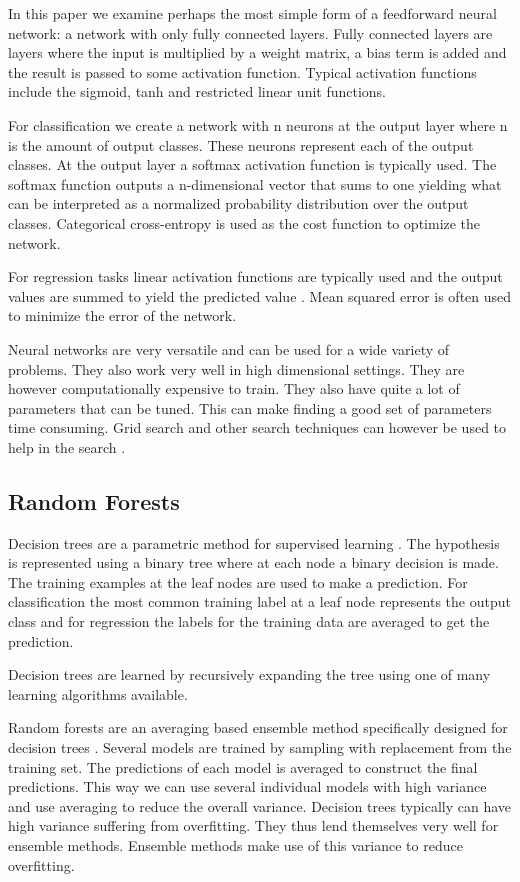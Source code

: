 In this paper we examine perhaps the most simple form of a feedforward neural network: a network with only fully connected layers. Fully connected layers are layers where the input is multiplied by a weight matrix, a bias term is added and the result is passed to some activation function. Typical activation functions include the sigmoid, tanh and restricted linear unit functions.

For classification we create a network with n neurons at the output layer where n is the amount of output classes. These neurons represent each of the output classes. At the output layer a softmax activation function is typically used. The softmax function outputs a n-dimensional vector that sums to one yielding what can be interpreted as a normalized probability distribution over the output classes. Categorical cross-entropy is used as the cost function to optimize the network.

For regression tasks linear activation functions are typically used and the output values are summed to yield the predicted value \cite{deeplearning4j-docs}. Mean squared error is often used to minimize the error of the network.

Neural networks are very versatile and can be used for a wide variety of problems. They also work very well in high dimensional settings. They are however computationally expensive to train. They also have quite a lot of parameters that can be tuned. This can make finding a good set of parameters time consuming. Grid search and other search techniques can however be used to help in the search \cite{deep-learning-book}.

\subsection{Random Forests}

Decision trees are a parametric method for supervised learning \cite{alpaydin}. The hypothesis is represented using a binary tree where at each node a binary decision is made. The training examples at the leaf nodes are used to make a prediction. For classification the most common training label at a leaf node represents the output class and for regression the labels for the training data are averaged to get the prediction.

Decision trees are learned by recursively expanding the tree using one of many learning algorithms available.

Random forests are an averaging based ensemble method specifically designed for decision trees \cite{sklearn}. Several models are trained by sampling with replacement from the training set. The predictions of each model is averaged to construct the final predictions. This way we can use several individual models with high variance and use averaging to reduce the overall variance. Decision trees typically can have high variance suffering from overfitting. They thus lend themselves very well for ensemble methods. Ensemble methods make use of this variance to reduce overfitting.

